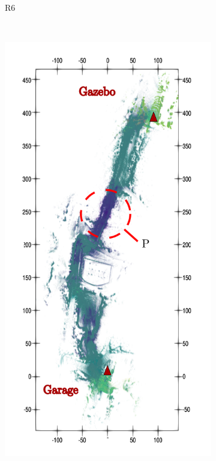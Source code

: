 \begin{figure}[h!]
\begin{center}
\begin{subfigure}[b]{0.3\textwidth}
			\label{fig:R6_pert}
			\caption{R6}
		\end{subfigure}%
		~
		\begin{subfigure}[b]{0.3\textwidth}
			\includegraphics[width=\linewidth]{figs/forest_canyon/run2_perturbations.pdf}

\end{subfigure}
\end{center}
\end{figure}
